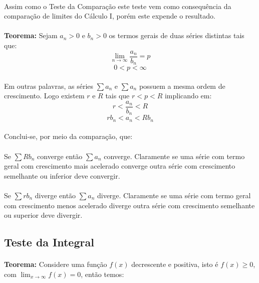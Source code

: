 \documentclass{article}
\begin{document}
\begin{enumerate}[rightmargin = \leftmargin]
        \paragraph{}Assim como o Teste da Comparação este teste vem como consequência da comparação de limites do Cálculo I, porém este expende o resultado.
        \paragraph{}\textbf{Teorema:} Sejam $a_{n}>0$ e $b_{n}>0$ os termos gerais de duas séries distintas tais que:
            \[\lim_{n\to\infty}\frac{a_{n}}{b_{n}}=p\]
            \[0<p<\infty\]
        \paragraph{}Em outras palavras, as séries $\sum a_{n}$ e $\sum a_{n}$ possuem a mesma ordem de crescimento. Logo existem $r$ e $R$ tais que $r<p<R$ implicando em:
            \[r<\frac{a_{n}}{b_{n}}<R\]
            \[rb_{n}<a_{n}<Rb_{n}\]
        \paragraph{}Conclui-se, por meio da comparação, que:
        \paragraph{}Se $\sum Rb_{n}$ converge então $\sum a_{n}$ converge. Claramente se uma série com termo geral com crescimento mais acelerado converge outra série com crescimento semelhante ou inferior deve convergir.
        \paragraph{}Se $\sum rb_{n}$ diverge então $\sum a_{n}$ diverge. Claramente se uma série com termo geral com crescimento menos acelerado diverge outra série com crescimento semelhante ou superior deve divergir.

    \subsection{Teste da Integral}
        \paragraph{}\textbf{Teorema:} Considere uma função $f(x)$ decrescente e positiva, isto é $f(x) \ge 0$,  com $\lim_{x\to\infty}f(x)=0$, então temos:

\end{enumerate}
\end{document}
